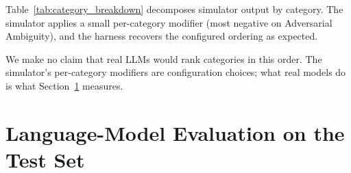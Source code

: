 \documentclass{article}
\begin{document}
Table~\ref{tab:category_breakdown} decomposes simulator output by category. The simulator applies a small per-category modifier (most negative on Adversarial Ambiguity), and the harness recovers the configured ordering as expected.

\begin{table}[t]
\centering
\caption{Simulator output by problem category. Differences across categories reflect simulator per-category modifiers, not measured model behaviour.}
\label{tab:category_breakdown}
\end{table}

We make no claim that real LLMs would rank categories in this order. The simulator's per-category modifiers are configuration choices; what real models do is what Section~\ref{sec:real_llm} measures.












\section{Language-Model Evaluation on the Test Set}
\label{sec:real_llm}
\end{document}
